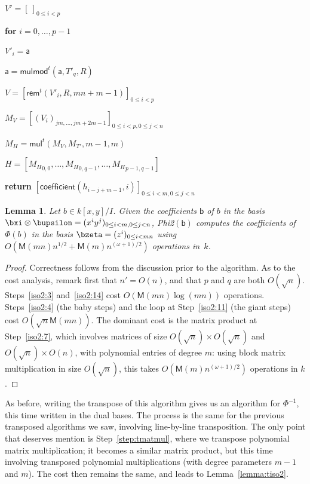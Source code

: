 \documentclass{sig-alternate}
\def\M {\ensuremath{\mathsf{M}}}
\def\va {\ensuremath{\mathsf{a}}}
\def\vb {\ensuremath{\mathsf{b}}}
\def\mul {\ensuremath{\mathsf{mul}}}
\def\rem {\ensuremath{\mathsf{rem}}}
\def\coeff {\ensuremath{\mathsf{coefficient}}}
\def\mulmod {\ensuremath{\mathsf{mulmod}}}
\newcounter{algo}
\newenvironment{algorithm_endline}[4]{\small\begin{center}\begin{minipage}{0.48\textwidth}
      \refstepcounter{algo}
      \label{#4}
      \sf
      \rule{\textwidth}{0.2pt}\\
      \makebox[\textwidth][c]{Algorithm~\arabic{algo}:~\textbf{#1}}\\
      \rule[0.5\baselineskip]{\textwidth}{0.2pt}\\

      \vspace{-12pt}

      \parbox{\textwidth}{\textbf{Input} #2}
      \parbox{\textwidth}{\textbf{Output} #3}

\vspace{-7pt}

      \begin{enumerate*}}{\end{enumerate*}
      \vspace{-11pt}
      \rule{\textwidth}{0.2pt}
\end{minipage}\end{center}
}
\newtheorem{Lemma}{Lemma}
\begin{document}
\begin{algofloat}[t]
\begin{algorithm_endline}
\item $V'=[\ ]_{0 \le i < p}$
\item {\bf for} {$i=0,\dots,p-1$}
\item \hspace{7mm} $V'_i = \va$
\item \hspace{7mm} $\va = \mulmod^t(\va,T'_q,R)$
\item $V = [\rem^t(V'_i,R,mn+m-1)]_{0 \le i < p}$
\item $M_V = [(V_{i})_{jm,\dots,jm+2m-1}]_{0 \le i < p, 0 \le j < n}$
\item\label{step:tmatmul} $M_H = \mul^t(M_V, M_{T'},m-1,m)$
\item $H=[{M_H}_{0,0},\dots,{M_H}_{0,q-1},\dots,{M_H}_{p-1,q-1}]$
\item {\bf return} $[\coeff(h_{i-j+m-1},i)]_{0 \le i < m, 0 \le j < n}$
  \end{algorithm_endline}
\vspace{-5ex}
\end{algofloat}

\begin{Lemma}
  Let $b \in k[x,y]/I$. Given the coefficients $\vb$ of $b$ in the
  basis $\bxi \otimes \bupsilon=(x^i y^j)_{0 \le i < m, 0 \le j < n}$,
  {\sf Phi2}$(\vb)$ computes the coefficients of $\Phi(b)$ in the
  basis $\bzeta=(z^i)_{0 \le i < mn}$ using $O(\M(mn)n^{1/2}+\M(m)
  n^{(\omega+1)/2} )$ operations in~$k$.
\end{Lemma}
\begin{proof}
  Correctness follows from the discussion prior to the algorithm.  As
  to the cost analysis, remark first that $n'=O(n)$, and that $p$ and
  $q$ are both $O(\sqrt{n})$. Steps~\ref{iso2:3} and~\ref{iso2:14}
  cost $O(\M(mn)\log(mn))$ operations. Steps~\ref{iso2:4} (the baby
  steps) and the loop at Step~\ref{iso2:11} (the giant steps) cost
  $O(\sqrt{n}\M(mn))$. The dominant cost is the matrix product at
  Step~\ref{iso2:7}, which involves matrices of size $O(\sqrt{n})
  \times O(\sqrt{n})$ and $O(\sqrt{n}) \times O(n)$, with polynomial
  entries of degree $m$: using block matrix multiplication in size
  $O(\sqrt{n})$, this takes $O(\M(m) n^{(\omega+1)/2})$ operations in
  $k$.
\end{proof}

As before, writing the transpose of this algorithm gives us an
algorithm for $\Phi^{-1}$, this time written in the dual bases.  The
process is the same for the previous transposed algorithms we saw,
involving line-by-line transposition. The only point that deserves
mention is Step~\ref{step:tmatmul}, where we transpose polynomial
matrix multiplication; it becomes a similar matrix product, but this
time involving transposed polynomial multiplications (with degree
parameters $m-1$ and $m$). The cost then remains the same, and leads to
Lemma~\ref{lemma:tiso2}.
\end{document}
